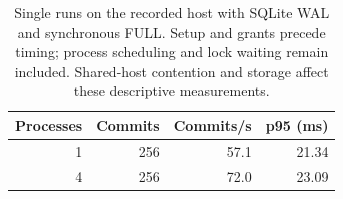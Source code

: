 \begin{table}[t]\centering\small\begin{tabular}{rrrr}\toprule
Processes & Commits & Commits/s & p95 (ms)\\\midrule
1 & 256 & 57.1 & 21.34\\
4 & 256 & 72.0 & 23.09\\
\bottomrule\end{tabular}\caption{Single runs on the recorded host with SQLite WAL and synchronous FULL. Setup and grants precede timing; process scheduling and lock waiting remain included. Shared-host contention and storage affect these descriptive measurements.}\label{tab:runtime}\end{table}
